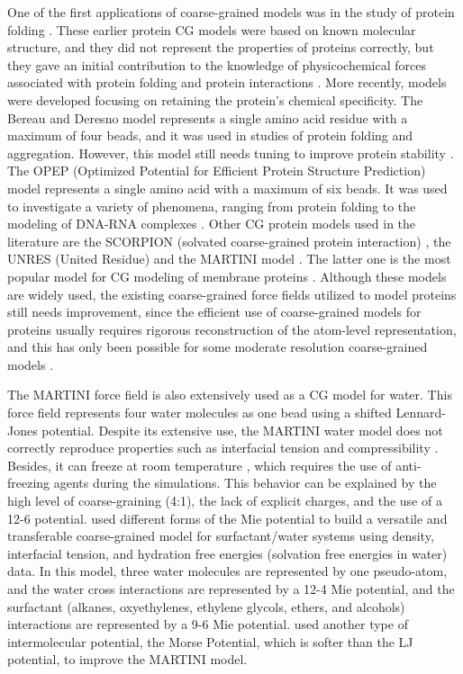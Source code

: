 One of the first applications of coarse-grained models was in the study of protein folding \cite{levitt1975,levitt1976}. These earlier protein CG models were based on known molecular structure, and they did not represent the properties of proteins correctly, but they gave an initial contribution to the knowledge of physicochemical forces associated with protein folding and protein interactions \cite{koga2001}. More recently, models were developed focusing on retaining the protein's chemical specificity. The Bereau and Deresno model \cite{bereau2009} represents a single amino acid residue with a maximum of four beads, and it was used in studies of protein folding and aggregation. However, this model still needs tuning to improve protein stability \cite{bereau2010}. The OPEP (Optimized Potential for Efficient Protein Structure Prediction) model \cite{opep2014,opep2015} represents a single amino acid with a maximum of six beads. It was used to investigate a variety of phenomena, ranging from protein folding to the modeling of DNA-RNA complexes \cite{opep2011,opep2009,opep2014}. Other CG protein models used in the literature are the SCORPION (solvated coarse-grained protein interaction)  \cite{scorpion2013}, the UNRES (United Residue) \cite{unres2014} and the MARTINI model \cite{martini2013}. The latter one is the most popular model for CG modeling of membrane proteins \cite{martini20132}. Although these models are widely used, the existing coarse-grained force fields utilized to model proteins still needs improvement, since the efficient use of coarse-grained models for proteins usually requires rigorous reconstruction of the atom-level representation, and this has only been possible for some moderate resolution coarse-grained models  \cite{kmiecik2016}.

The MARTINI force field is also extensively used as a CG model for water. This force field represents four water molecules as one bead using a shifted Lennard-Jones potential. Despite its extensive use, the MARTINI water model does not correctly reproduce properties such as interfacial tension and compressibility \cite{shinoda2010}. Besides, it can freeze at room temperature \cite{winger2009,martini2007}, which requires the use of anti-freezing agents during the simulations. This behavior can be explained by the high level of coarse-graining (4:1), the lack of explicit charges, and the use of a 12-6 potential.  used different forms of the Mie potential to build a versatile and transferable coarse-grained model for surfactant/water systems using density, interfacial tension, and hydration free energies (solvation free energies in water) data. In this model, three water molecules are represented by one pseudo-atom, and the water cross interactions are represented by a 12-4 Mie potential, and the surfactant (alkanes, oxyethylenes, ethylene glycols, ethers, and alcohols) interactions are represented by a 9-6 Mie potential.  used another type of intermolecular potential, the Morse Potential, which is softer than the LJ potential, to improve the MARTINI model. 

